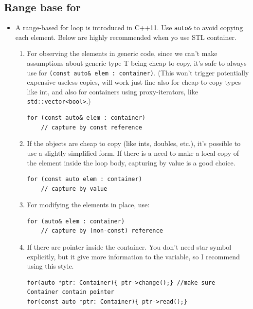 \documentclass[a4paper,11pt,twoside]{book}
\begin{document}
\subsection{Range base for}
\begin{itemize}
	
	\item A range-based for loop is introduced in C++11. Use \texttt{auto\&} to avoid copying each element. Below are highly recommended when yo use STL container.
	
	\begin{enumerate}
		\item  For observing the elements in generic code, since we can't make assumptions about generic type T being cheap to copy, it's safe to always use for \texttt{(const auto\& elem : container)}.  (This won't trigger potentially expensive useless copies, will work just fine also for cheap-to-copy types like int, and also for containers using proxy-iterators, like \texttt{std::vector<bool>}.)
\begin{lstlisting}[numbers=none]
for (const auto& elem : container)    
	// capture by const reference
\end{lstlisting}	
		
		
		\item If the objects are cheap to copy (like ints, doubles, etc.), it's possible to use a slightly simplified form. If there is a need to make a local copy of the element inside the loop body, capturing by value is a good choice.
		
\begin{lstlisting}[numbers=none]
for (const auto elem : container)   
	// capture by value
\end{lstlisting}            
		
		\item For modifying the elements in place, use:
\begin{lstlisting}[numbers=none]
for (auto& elem : container)    
	// capture by (non-const) reference
\end{lstlisting}
		
		\item If there are pointer inside the container. You don't need star symbol explicitly, but it give more information to the variable, so I recommend using this style.
\begin{lstlisting}[numbers=none]
for(auto *ptr: Container){ ptr->change();} //make sure Container contain pointer
for(const auto *ptr: Container){ ptr->read();}
\end{lstlisting}
		

\end{enumerate}
\end{itemize}
\end{document}
